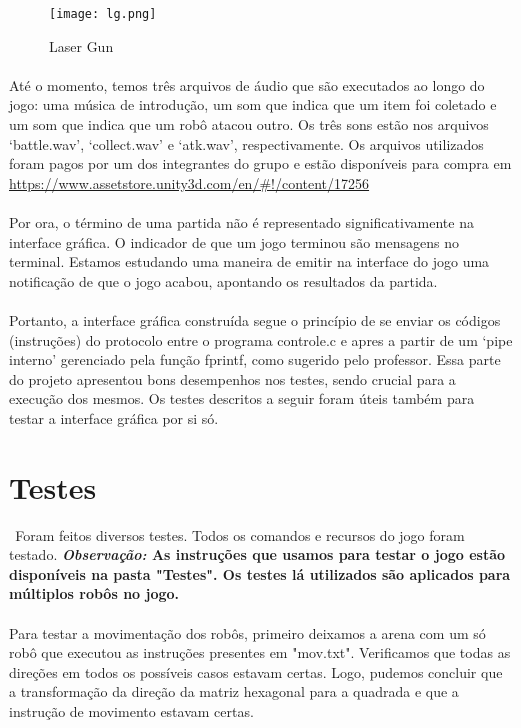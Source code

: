 \documentclass[a4paper]{article}
\begin{document}
 \begin{figure}[h]
 \begin{center}
 \texttt{[image: lg.png]}
 \caption{Laser Gun}
 \label{fig:gun}
 \end{center} 
 \end{figure}
 
 \paragraph{}
 Até o momento, temos três arquivos de áudio que são executados ao longo do jogo: uma música de introdução, um som que indica que um item foi coletado e um som que indica que um robô atacou outro. Os três sons estão nos arquivos ‘battle.wav’, ‘collect.wav’ e ‘atk.wav’, respectivamente. 
Os arquivos utilizados foram pagos por um dos integrantes do grupo e estão disponíveis para compra em \url{https://www.assetstore.unity3d.com/en/#!/content/17256}

\paragraph{}
Por ora, o término de uma partida não é representado significativamente na interface gráfica. O indicador de que um jogo terminou são mensagens no terminal. Estamos estudando uma maneira de emitir na interface do jogo uma notificação de que o jogo acabou, apontando os resultados da partida.

\paragraph{}
Portanto, a interface gráfica construída segue o princípio de se enviar os códigos (instruções) do protocolo entre o programa controle.c e apres a partir de um ‘pipe interno’ gerenciado pela função fprintf, como sugerido pelo professor. Essa parte do projeto apresentou bons desempenhos nos testes, sendo crucial para a execução dos mesmos. Os testes descritos a seguir foram úteis também para testar a interface gráfica por si só.


\section{Testes}
$\: \:$Foram feitos diversos testes. Todos os comandos e recursos do jogo foram testado. \textbf{\textit{Observação:} As instruções que usamos para testar o jogo estão disponíveis na pasta "Testes". Os testes lá utilizados são aplicados para múltiplos robôs no jogo.}
\paragraph{}
Para testar a movimentação dos robôs, primeiro deixamos a arena com um só robô que executou as instruções presentes em "mov.txt". Verificamos que todas as direções em todos os possíveis casos estavam certas. Logo, pudemos concluir que a transformação da direção da matriz hexagonal para a quadrada e que a instrução de movimento estavam certas.
\end{document}
